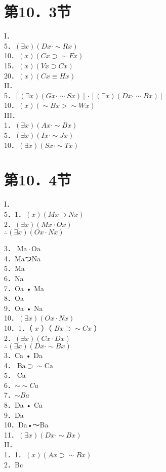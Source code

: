 \section*{第10．3节}
I．\\
5．$(\exists x)(D x \cdot \sim R x)$\\
10．$(x)(C x \supset \sim F x)$\\
15．$(x)(V x \supset C x)$\\
20．$(x)(C x \equiv H x)$\\
II．\\
5．$[(\exists x)(G x \cdot \sim S x)] \cdot[(\exists x)(D x \cdot \sim B x)]$\\
10．$(x)(\sim B x>\sim W x)$\\
III．\\
1．$(\exists x)(A x \cdot \sim B x)$\\
5．$(\exists x)(I x \cdot \sim J x)$\\
10．$(\exists x)(S x \cdot \sim T x)$

\section*{第10．4节}
I．\\
5．1．$(x)(M x \supset N x)$\\
2．$(\exists x)(M x \cdot O x)$\\
$\therefore(\exists x)(O x \cdot N x)$

3． $\mathrm{Ma} \cdot \mathrm{Oa}$\\
4．MaつNa\\
5．Ma\\
6．Na\\
7．Oa • Ma\\
8．Oa\\
9．Oa • Na\\
10．$(\exists x)(O x \cdot N x)$\\
10．1．（ $x$ ）（ $B x \supset \sim C x$ ）\\
2．$(\exists x)(C x \cdot D x)$\\
$\therefore(\exists x)(D x \cdot \sim B x)$\\
3．Ca • Da\\
4． $\mathrm{Ba} \supset \sim \mathrm{Ca}$\\
5． Ca\\
6．$\sim \sim C a$\\
7．$\sim B a$\\
8．Da • Ca\\
9．Da\\
10．Da•～Ba\\
11．$(\exists x)(D x \cdot \sim B x)$\\
II．\\
1．1．$(x)(A x \supset \sim B x)$\\
2．Bc

